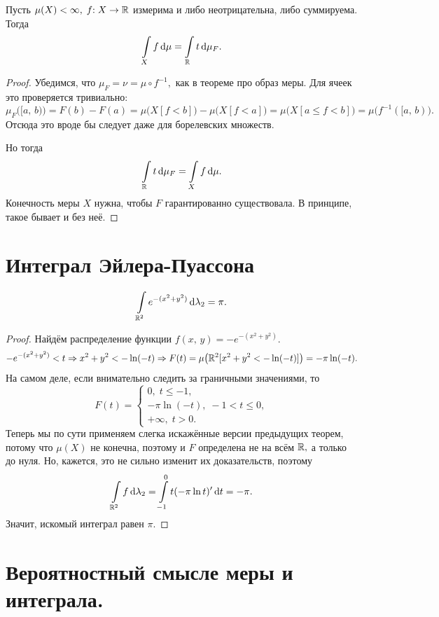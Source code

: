 \documentclass{notes}
\begin{document}
 	\begin{thm}
 		Пусть $\mu(X) < \infty, \; f\text{\text{:}}\; X \to \mathbb{R}$ измерима и либо неотрицательна, либо суммируема. Тогда
 		\[
 			\int\limits_{X} f \, \mathrm{d} \mu = \int\limits_{\mathbb{R}} t \, \mathrm{d} \mu_{F}.
 		\]
 		\begin{proof}
 			Убедимся, что $\mu_F = \nu = \mu \circ f^{-1},$ как в теореме про образ меры. Для ячеек это проверяется тривиально:
 			\[
 				\mu_F \big([a, \, b)\big) = F(b) - F(a) = \mu\big(X[f < b]\big) - \mu\big(X[f < a]\big) = \mu \big(X[a \leqslant f < b]\big) = \mu\big(f^{-1}([a, \, b)\big).
 			\]
 			Отсюда это вроде бы следует даже для борелевских множеств.

 			Но тогда
 			\[
 				\int\limits_{\mathbb{R}} t \, \mathrm{d} \mu_{F} = \int\limits_{X} f \, \mathrm{d} \mu.
 			\]
 			Конечность меры $X$ нужна, чтобы $F$ гарантированно существовала. В принципе, такое бывает и без неё.
 		\end{proof}
 	\end{thm}

\section{Интеграл Эйлера-Пуассона}

	\begin{thm}
		\[
			\int\limits_{\mathbb{R}^2} e^{-(x^2 + y^2)} \, \mathrm{d} \lambda_2 = \pi.
		\]
		\begin{proof}
			Найдём распределение функции $f(x, \, y) = -e^{-(x^2 + y^2)}$.
			\[
				-e^{-(x^2 + y^2)} < t \Rightarrow x^2 + y^2 < -\ln (-t) \Rightarrow F(t) = \mu\big(\mathbb{R}^2[x^2 + y^2 < -\ln (-t)]\big) = -\pi \ln(-t).
			\]
			На самом деле, если внимательно следить за граничными значениями, то
			\[
				F(t) = \begin{cases}
					0, \; t \leqslant -1, \\
					-\pi \ln(-t), \; -1 < t \leqslant 0, \\
					+\infty, \; t > 0.
				\end{cases}
			\]
			Теперь мы по сути применяем слегка искажённые версии предыдущих теорем, потому что $\mu(X)$ не конечна, поэтому и $F$ определена не на всём $\mathbb{R},$ а только до нуля. Но, кажется, это не сильно изменит их доказательств, поэтому
			\[
				\int\limits_{\mathbb{R}^2} f \, \mathrm{d} \lambda_2 = \int\limits_{-1}^0 t (-\pi \ln t)' \, \mathrm{d} t = -\pi.
			\]
			Значит, искомый интеграл равен $\pi$.
		\end{proof}
	\end{thm}

\section{Вероятностный смысле меры и интеграла.}
\end{document}
